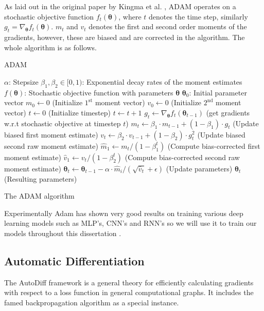 As laid out in the original paper by Kingma et al. \cite{kingma_adam:_2014}, ADAM operates on a
stochastic objective function $f_t(\bm{\theta})$, where $t$ denotes the time
step, similarly $g_t = \nabla_{\bm{\theta}}f_t(\bm{\theta})$. $m_t$ and $v_t$ denotes the first and second order moments of
the gradients, however, these are biased and are corrected in the algorithm.
The whole algorithm is as follows.
\begin{algorithm}[H]
  \caption{ADAM}\label{ADAM}
  \begin{algorithmic}[1]
    \Require $\alpha$: Stepsize
    \Require $\beta_1, \beta_2 \in [0, 1)$: Exponential decay rates of the moment estimates
    \Require $f(\bm{\theta})$: Stochastic objective function with parameters
    $\bm{\theta}$
    \Require $\bm{\theta}_0$: Initial parameter vector
    \State $m_0 \gets 0$ (Initialize $1^{\text{st}}$ moment vector)
    \State $v_0 \gets 0$ (Initialize $2^{\text{nd}}$ moment vector)
    \State $t \gets 0$ (Initialize timestep)
    \State $t \gets t + 1$
    \State $g_t \gets \nabla_{\bm{\theta}}f_t(\bm{\theta}_{t-1})$ (get gradients w.r.t stochastic objective at timestep $t$)
    \State $m_t \gets \beta_1 \cdot m_{t-1} + (1 - \beta_1) \cdot g_t$ (Update biased first moment estimate)
    \State $v_t \gets \beta_2 \cdot v_{t-1} + (1 - \beta_2) \cdot g^2_t$ (Update biased second raw moment estimate)
    \State $\hat{m}_1 \gets m_t / (1 - \beta^t_1)$ (Compute bias-corrected first moment estimate)
    \State $\hat{v}_1 \gets v_t / (1 - \beta^t_2)$ (Compute bias-corrected second raw moment estimate)
    \State $\bm{\theta}_t \gets \bm{\theta}_{t-1} - \alpha \cdot \hat{m}_i/(\sqrt{\hat{v}_t} + \epsilon)$ (Update parameters)
    \EndWhile
    \Return $\bm{\theta}_t$ (Resulting parameters)
  \end{algorithmic}
  \caption{The ADAM algorithm}
\end{algorithm}

Experimentally Adam has shown very good results on training various deep
learning models such as MLP's, CNN's and RNN's so we will use it to train our
models throughout this dissertation \cite{kingma_adam:_2014}.

\subsection{Automatic Differentiation}
\label{ch:autodiff}
The AutoDiff framework is a general theory for efficiently
calculating gradients with respect to a loss function in general computational graphs.
It includes the famed backpropagation \cite{Bishop:2006,
  Rumelhart:1986:LIR:104279.104293} algorithm as a special instance.

